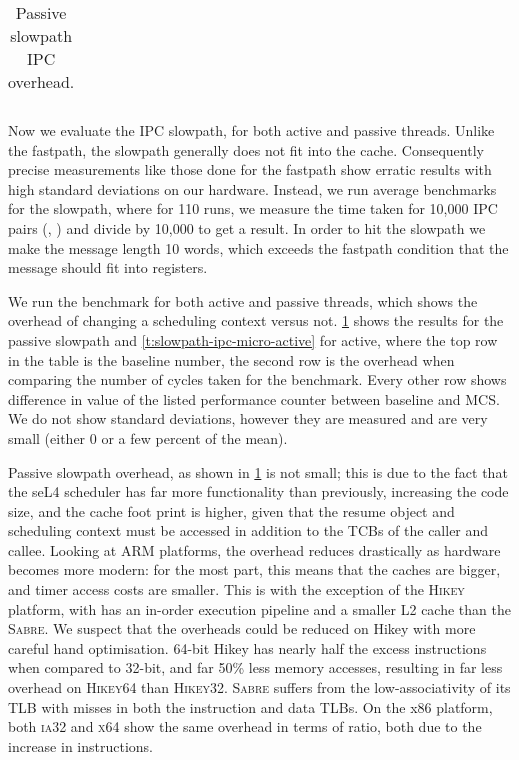 \begin{table}[t]\centering
    \begin{tabularx}{\textwidth}{Xlllllll}\toprule
        
        \bottomrule
    \end{tabularx}
    \caption{Passive slowpath IPC overhead.}
    \label{t:slowpath-ipc-micro}
\end{table}
Now we evaluate the \gls{IPC} slowpath, for both active and passive threads. Unlike the fastpath, the slowpath
generally does not fit into the cache. Consequently precise measurements like those done for the
fastpath show erratic results with high standard deviations on our hardware. Instead, we run average
benchmarks for the slowpath, where for 110 runs, we measure the time taken for 10,000 IPC pairs
(\call, \replyrecv) and divide by 10,000 to get a result.
In order to hit the slowpath we make the message length 10 words, which exceeds
the fastpath condition that the message should fit into registers.

We run the benchmark for both active and passive threads, which shows the overhead of changing a
scheduling context versus not. \cref{t:slowpath-ipc-micro} shows the results for the passive
slowpath and \cref{t:slowpath-ipc-micro-active} for active, where the top row in the table is 
the baseline number, the second row is the overhead when
comparing the number of cycles taken for the benchmark. Every other row shows difference in value of the 
listed performance counter between baseline and MCS. We do not show standard deviations, however
they are measured and are very small (either 0 or a few percent of the mean). 

Passive slowpath overhead, as shown in \cref{t:slowpath-ipc-micro} is not small;
this is due to the fact that the seL4 scheduler has far more
functionality than previously, increasing the code size, and the cache foot print is higher, given
that the resume object and scheduling context must be accessed in addition to the \glspl{TCB} of the
caller and callee. Looking at ARM platforms, the overhead reduces drastically as hardware becomes
more modern: for the most part, this means that the caches are bigger, and timer access costs are
smaller. This is with the exception of the \textsc{Hikey} platform, with has an in-order
execution pipeline and a smaller L2 cache than the \textsc{Sabre}. We suspect that the overheads could be reduced on Hikey with more careful hand
optimisation. 64-bit Hikey has nearly half the excess instructions when compared to 32-bit, and far
50\% less memory accesses, resulting in far less overhead on \textsc{Hikey64} than \textsc{Hikey32}.
\textsc{Sabre} suffers from the low-associativity of its \gls{TLB} with misses in both the instruction and
data TLBs. On the x86 platform, both \textsc{ia32} and \textsc{x64} show the same overhead in terms
of ratio, both due to the increase in instructions.

